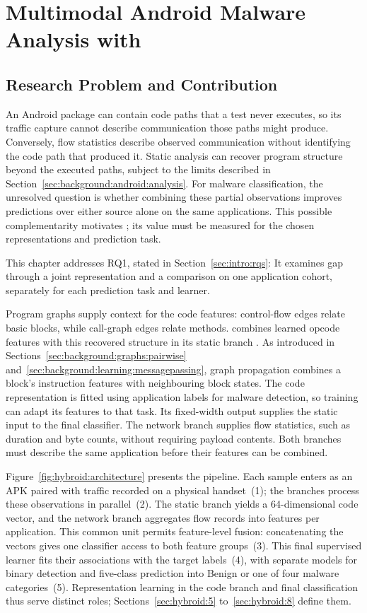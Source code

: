 \chapter{Multimodal Android Malware Analysis with \hybroid{}}
\label{chap:hybroid}

\section{Research Problem and Contribution}
\label{sec:hybroid:1}

An Android package can contain code paths that a test never executes, so its traffic capture
cannot describe communication those paths might produce. Conversely, flow statistics describe
observed communication without identifying the code path that produced it. Static analysis can
recover program structure beyond the executed paths, subject to the limits described in
Section~\ref{sec:background:android:analysis}. For malware classification, the unresolved
question is whether combining these partial observations improves predictions over either
source alone on the same applications. This possible complementarity motivates \hybroid{};
its value must be measured for the chosen representations and prediction task.

This chapter addresses RQ1, stated in Section~\ref{sec:intro:rqs}: \rqOneText{}
It examines gap~ through a joint representation and a comparison on one application
cohort, separately for each prediction task and learner.

Program graphs supply context for the code features: control-flow edges relate basic blocks,
while call-graph edges relate methods. \hybroid{} combines learned opcode features with this
recovered structure in its static branch \cite{norouzian2021hybroid}. As introduced in
Sections~\ref{sec:background:graphs:pairwise} and~\ref{sec:background:learning:messagepassing},
graph propagation combines a block's instruction features with neighbouring block states.
The code representation is fitted using application labels for malware detection, so training
can adapt its features to that task. Its fixed-width output supplies the static input to the
final classifier.
The network branch supplies flow statistics, such as duration and byte counts, without requiring
payload contents. Both branches must describe the same application before their features can
be combined.

Figure~\ref{fig:hybroid:architecture} presents the pipeline. Each sample enters as an APK paired
with traffic recorded on a physical handset~(1); the branches process these observations in
parallel~(2). The static branch yields a 64-dimensional code vector, and the network branch
aggregates flow records into \netfeatures{} features per application. This common unit permits
feature-level fusion: concatenating the vectors gives one classifier access to both feature
groups~(3). This final supervised learner fits their associations with the target labels~(4),
with separate models for binary detection and five-class prediction into Benign or one of four
malware categories~(5). Representation learning in the code branch and final classification
thus serve distinct roles; Sections~\ref{sec:hybroid:5} to~\ref{sec:hybroid:8} define them.

